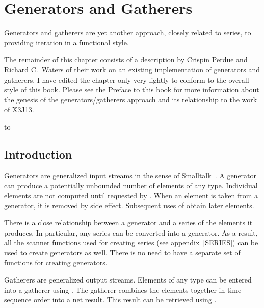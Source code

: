 

\clearpage\def\pagestatus{FINAL PROOF}

\chapter{Generators and Gatherers}
\label{GENERATORS}

\begin{new}
\prefaceword  Generators and gatherers are yet another
approach, closely related to series,
to providing iteration in a functional style.

The remainder of this chapter consists of a description by Crispin Perdue
and Richard C.~Waters of their work on an existing implementation of
generators and gatherers.  I have edited the chapter only very lightly to
conform to the overall style of this book.  Please see the Preface to this
book for more information about the genesis of the generators/gatherers
approach and its relationship to the work of X3J13.

\noindent\hbox to \textwidth{\hss---Guy L. Steele Jr.}

\section{Introduction}

Generators are generalized input streams in the sense of
Smalltalk~\cite{SMALLTALK-80-BOOK}.  A generator can produce a potentially
unbounded number of elements of any type.  Individual elements are not
computed until requested by .  When an element is taken from
a generator, it is removed by side effect.  Subsequent uses of 
 obtain later elements.

There is a close relationship between a generator and a series of the
elements it produces.  In particular, any series can be converted into
a generator.  As a result, all the scanner functions used for
creating series (see appendix~\ref{SERIES}) can be used to create
generators as well.  There is no need to have a separate
set of functions for creating generators.

Gatherers are generalized output streams.  Elements of any type can be
entered into a gatherer using .  The gatherer combines the
elements together in time-sequence order into a net result.  This result can
be retrieved using .


\end{new}
